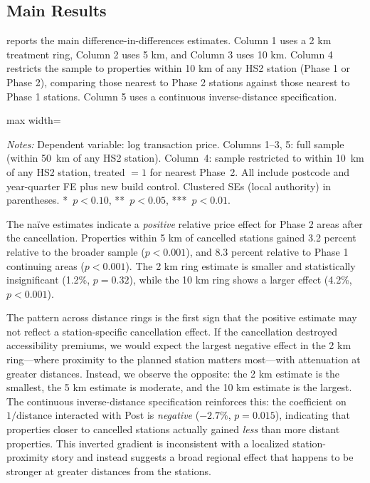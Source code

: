 \documentclass[12pt]{article}
\begin{document}
\subsection{Main Results}

 reports the main difference-in-differences estimates. Column 1 uses a 2 km treatment ring, Column 2 uses 5 km, and Column 3 uses 10 km. Column 4 restricts the sample to properties within 10 km of any HS2 station (Phase 1 or Phase 2), comparing those nearest to Phase 2 stations against those nearest to Phase 1 stations. Column 5 uses a continuous inverse-distance specification.

\begin{table}[H]
\centering
\caption{Effect of HS2 Phase 2 Cancellation on Property Prices}
\begin{threeparttable}
\begin{adjustbox}{max width=\textwidth}

\end{adjustbox}
\begin{tablenotes}[flushleft]
\small
\item \textit{Notes:} Dependent variable: log transaction price. Columns 1--3, 5: full sample (within 50~km of any HS2 station). Column~4: sample restricted to within 10~km of any HS2 station, treated $= 1$ for nearest Phase~2. All include postcode and year-quarter FE plus new build control. Clustered SEs (local authority) in parentheses. {*}~$p<0.10$, {**}~$p<0.05$, {***}~$p<0.01$.
\end{tablenotes}
\end{threeparttable}
\label{tab:main}
\end{table}

The na\"ive estimates indicate a \textit{positive} relative price effect for Phase 2 areas after the cancellation. Properties within 5 km of cancelled stations gained 3.2 percent relative to the broader sample ($p < 0.001$), and 8.3 percent relative to Phase 1 continuing areas ($p < 0.001$). The 2 km ring estimate is smaller and statistically insignificant (1.2\%, $p = 0.32$), while the 10 km ring shows a larger effect (4.2\%, $p < 0.001$).

The pattern across distance rings is the first sign that the positive estimate may not reflect a station-specific cancellation effect. If the cancellation destroyed accessibility premiums, we would expect the largest negative effect in the 2 km ring---where proximity to the planned station matters most---with attenuation at greater distances. Instead, we observe the opposite: the 2 km estimate is the smallest, the 5 km estimate is moderate, and the 10 km estimate is the largest. The continuous inverse-distance specification reinforces this: the coefficient on $1/\text{distance}$ interacted with Post is \textit{negative} ($-2.7\%$, $p = 0.015$), indicating that properties closer to cancelled stations actually gained \textit{less} than more distant properties. This inverted gradient is inconsistent with a localized station-proximity story and instead suggests a broad regional effect that happens to be stronger at greater distances from the stations.
\end{document}
